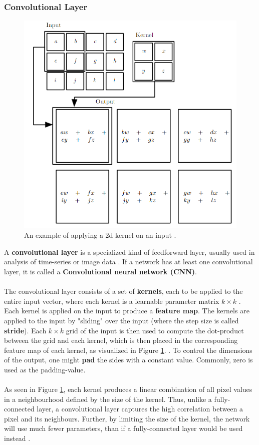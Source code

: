 \documentclass[./main.tex]{subfiles}
\begin{document}
\subsubsection{Convolutional Layer}
\begin{figure}[htbp]
    \centering
    \includegraphics[width = 0.5 \textwidth]{./entities/2d_conv_example.PNG}
    \caption{An example of applying a 2d kernel on an input \cite{DL_book}.}
    \label{fig:2d_conv_example}
\end{figure}
\noindent A \textbf{convolutional layer} is a specialized kind of feedforward layer, usually used in analysis of time-series or image data \cite{DL_book}. If a network has at least one convolutional layer, it is called a \textbf{Convolutional neural network (CNN)}.
\\
\\
\noindent The convolutional layer consists of a set of \textbf{kernels}, each to be applied to the entire input vector, where each kernel is a learnable parameter matrix $k \times k$ \cite{everything}. Each kernel is applied on the input to produce a \textbf{feature map}. The kernels are applied to the input by "sliding" over the input (where the step size is called \textbf{stride}). Each $k \times k$ grid of the input is then used to compute the dot-product between the grid and each kernel, which is then placed in the corresponding feature map of each kernel, as visualized in Figure \ref{fig:2d_conv_example}. \cite{bsc_thesis}. To control the dimensions of the output, one might \textbf{pad} the sides with a constant value. Commonly, zero is used as the padding-value.
\\
\\
As seen in Figure \ref{fig:2d_conv_example}, each kernel produces a linear combination of all pixel values in a neighbourhood defined by the size of the kernel. Thus, unlike a fully-connected layer, a convolutional layer captures the high correlation between a pixel and its neighbours. Further, by limiting the size of the kernel, the network will use much fewer parameters, than if a fully-connected layer would be used instead \cite{DL_book}.
\end{document}
